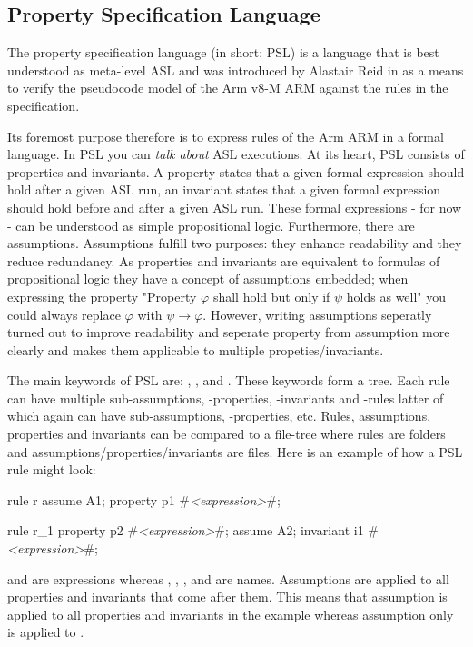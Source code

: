 \documentclass{securem}
\begin{document}
\subsection{Property Specification Language}

The property specification language (in short: PSL) is a language that is best understood as meta-level ASL and was introduced by Alastair Reid in \cite{Reid17} as a means to verify the pseudocode model of the Arm v8-M ARM against the rules in the specification.

Its foremost purpose therefore is to express rules of the Arm ARM in a formal language.
In PSL you can \textit{talk about} ASL executions.
At its heart, PSL consists of properties and invariants.
A property states that a given formal expression should hold after a given ASL run, an invariant states that a given formal expression should hold before and after a given ASL run.
These formal expressions - for now - can be understood as simple propositional logic.
Furthermore, there are assumptions.
Assumptions fulfill two purposes: they enhance readability and they reduce redundancy.
As properties and invariants are equivalent to formulas of propositional logic they have a concept of assumptions embedded; when expressing the property "Property $ \varphi $ shall hold but only if $ \psi $ holds as well" you could always replace $ \varphi $ with $ \psi \rightarrow \varphi $.
However, writing assumptions seperatly turned out to improve readability and seperate property from assumption more clearly and makes them applicable to multiple propeties/invariants.

The main keywords of PSL are: , ,  and .
These keywords form a tree.
Each rule can have multiple sub-assumptions, -properties, -invariants and -rules latter of which again can have sub-assumptions, -properties, etc.
Rules, assumptions, properties and invariants can be compared to a file-tree where rules are folders and assumptions/properties/invariants are files.
Here is an example of how a PSL rule might look:

\begin{psl}
rule r
    assume A1;
    property p1 #\textit{<expression>}#;

    rule r_1
        property p2 #\textit{<expression>}#;
        assume A2;
        invariant i1 #\textit{<expression>}#;
\end{psl}

 and  are expressions whereas , , ,  and  are names.
Assumptions are applied to all properties and invariants that come after them.
This means that assumption  is applied to all properties and invariants in the example whereas assumption  only is applied to .
\end{document}
